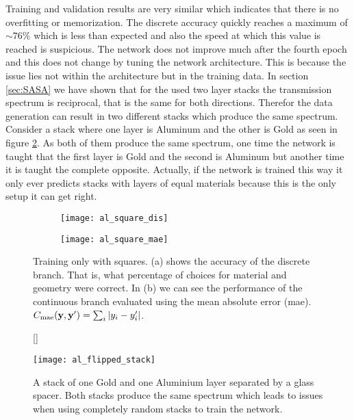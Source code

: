 \indent
Training and validation results are very similar which indicates that there is no overfitting or memorization. The discrete accuracy quickly reaches a maximum of $\sim 76\%$ which is less than expected and also the speed at which this value is reached is suspicious. The network does not improve much after the fourth epoch and this does not change by tuning the network architecture. This is because the issue lies not within the architecture but in the training data. In section \ref{sec:SASA} we have shown that for the used two layer stacks the transmission spectrum is reciprocal, that is the same for both directions. Therefor the data generation can result in two different stacks which produce the same spectrum. Consider a stack where one layer is Aluminum and the other is Gold as seen in figure \ref{fig:al:same_spec}. As both of them produce the same spectrum, one time the network is taught that the first layer is Gold and the second is Aluminum but another time it is taught the complete opposite. Actually, if the network is trained this way it only ever predicts stacks with layers of equal materials because this is the only setup it can get right.

\begin{figure}[H]
    \centering
    \captionsetup[subfigure]{position=b}
    \begin{subfigure}{.5\textwidth}
        \centering
        \texttt{[image: al\_square\_dis]}
        \caption{}
    \end{subfigure}%
    \begin{subfigure}{.5\textwidth}
        \centering
        \texttt{[image: al\_square\_mae]}
        \caption{}
    \end{subfigure}
    
    \caption{Training only with squares. (a) shows the accuracy of the discrete branch. That is, what percentage of choices for material and geometry were correct. In (b) we can see the performance of the continuous branch evaluated using the mean absolute error (mae).
    $C_{\mathrm{mae}}(\vb y, \vb y') = \sum_i \qty|y_i - y'_i|$.}
    \label{fig:al:square_results}
    \end{figure}

\begin{figure}[H]
    [\FBwidth]
    {\caption{A stack of one Gold and one Aluminium layer separated by a glass spacer. Both stacks produce the same spectrum which leads to issues when using completely random stacks to train the network.}
    \label{fig:al:same_spec}}
    {\texttt{[image: al\_flipped\_stack]}}
\end{figure}


